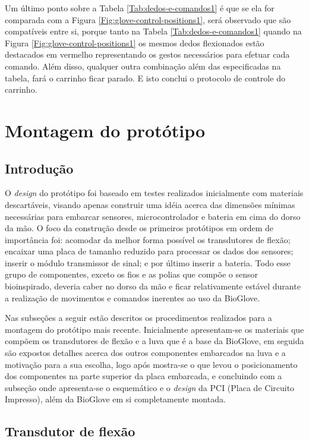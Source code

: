 \documentclass[
	12pt,				%
	openright,			%
	oneside,			%
	a4paper,			%
	english,			%
	brazil				%
	]{abntex2}
\begin{document}
		Um último ponto sobre a Tabela \ref{Tab:dedos-e-comandos1} é que se ela for comparada com a Figura \ref{Fig:glove-control-positions1}, será observado que são compatíveis entre si, porque tanto na Tabela \ref{Tab:dedos-e-comandos1} quando na Figura \ref{Fig:glove-control-positions1} os mesmos dedos flexionados estão destacados em vermelho representando os gestos necessários para efetuar cada comando. Além disso, qualquer outra combinação além das especificadas na tabela, fará o carrinho ficar parado. E isto conclui o protocolo de controle do carrinho.



		\section{Montagem do protótipo}

		
				\subsection{Introdução}	
				

		O \textit{design} do protótipo foi baseado em testes realizados inicialmente com materiais descartáveis, visando apenas construir uma idéia acerca das dimensões mínimas necessárias para embarcar sensores, microcontrolador e bateria em cima do dorso da mão. O foco da construção desde os primeiros protótipos em ordem de importância foi: acomodar da melhor forma possível os transdutores de flexão; encaixar uma placa de tamanho reduzido para processar os dados dos sensores; inserir o módulo transmissor de sinal; e por último inserir a bateria. Todo esse grupo de componentes, exceto os fios e as polias que compõe o sensor bioinspirado, deveria caber no dorso da mão e ficar relativamente estável durante a realização de movimentos e comandos inerentes ao uso da BioGlove.

		Nas subseções a seguir estão descritos os procedimentos realizados para a montagem do protótipo mais recente. Inicialmente apresentam-se os materiais que compõem os transdutores de flexão e a luva que é a base da BioGlove, em seguida são expostos detalhes acerca dos outros componentes embarcados na luva e a motivação para a sua escolha, logo após mostra-se o que levou o posicionamento dos componentes na parte superior da placa embarcada, e concluindo com a subseção onde apresenta-se o esquemático e o \textit{design} da PCI (Placa de Circuito Impresso), além da BioGlove em si completamente montada.

		\subsection{Transdutor de flexão}
\end{document}

